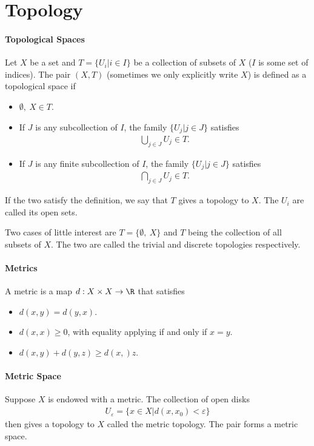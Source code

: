 \section{Topology}

\paragraph{Topological Spaces}
Let $X$ be a set and $T = \{U_{i} | i\in I\}$ be a collection of subsets of $X$ ($I$ is some set of indices). The pair $(X, T)$ (sometimes we only explicitly write $X$) is defined as a topological space if
\begin{itemize}
	\item $\emptyset,\ X\in T$.
	\item If $J$ is any subcollection of $I$, the family $\{U_{j} | j\in J\}$ satisfies
	\begin{align*}
		\bigcup\limits_{j\in J}U_{j}\in T.
	\end{align*}
	\item If $J$ is any finite subcollection of $I$, the family $\{U_{j} | j\in J\}$ satisfies
	\begin{align*}
		\bigcap\limits_{j\in J}U_{j}\in T.
	\end{align*}
\end{itemize}
If the two satisfy the definition, we say that $T$ gives a topology to $X$. The $U_{i}$ are called its open sets.

Two cases of little interest are $T = \{\emptyset,\ X\}$ and $T$ being the collection of all subsets of $X$. The two are called the trivial and discrete topologies respectively.

\paragraph{Metrics}
A metric is a map $d: X\times X\to \R$ that satisfies
\begin{itemize}
	\item $d(x, y) = d(y, x)$.
	\item $d(x, x) \geq 0$, with equality applying if and only if $x = y$.
	\item $d(x, y) + d(y, z) \geq d(x, )z$.
\end{itemize}

\paragraph{Metric Space}
Suppose $X$ is endowed with a metric. The collection of open disks
\begin{align*}
	U_{\varepsilon} = \{x\in X | d(x, x_{0}) < \varepsilon\}
\end{align*}
then gives a topology to $X$ called the metric topology. The pair forms a metric space.

